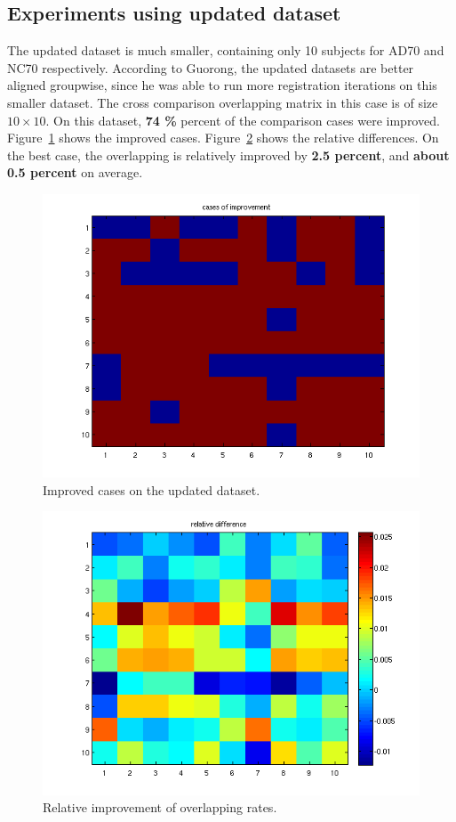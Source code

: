 \documentclass[preprint,review,12pt]{elsarticle}
\begin{document}
\subsection{Experiments using updated dataset}
The updated dataset is much smaller, containing only 10 subjects for AD70 and NC70 respectively. According to Guorong, the updated datasets are better aligned groupwise, since he was able to run more registration iterations on this smaller dataset. The cross comparison overlapping matrix in this case is of size $10 \times 10$. On this dataset, {\bf 74 \%} percent of the comparison cases were improved. Figure~\ref{fig:cases_mah_updated} shows the improved cases. Figure~\ref{fig:relative_updated} shows the relative differences. On the best case, the overlapping is relatively improved by {\bf 2.5 percent}, and {\bf about 0.5 percent} on average.

\begin{figure}[h!!!!!!!!!!!!tb]
\begin{center}
	\includegraphics[width=.8\linewidth]{figs/cases_improved2.png}
\end{center}
\caption{Improved cases on the updated dataset.}
\label{fig:cases_mah_updated}
\end{figure}

\begin{figure}[h!!!!!!!!!!!!tb]
\begin{center}
	\includegraphics[width=.8\linewidth]{figs/relative_improvement2.png}
\end{center}
\caption{Relative improvement of overlapping rates.}
\label{fig:relative_updated}
\end{figure}
\end{document}
